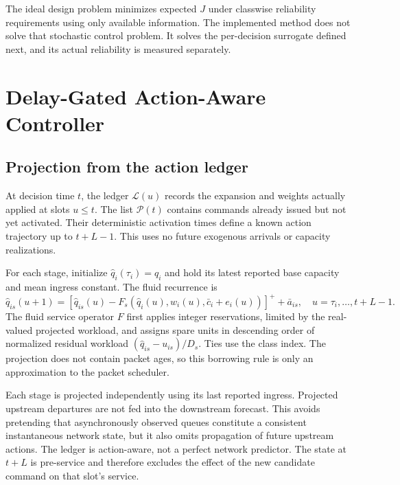 \documentclass[10pt,a4paper]{article}
\newcommand{\pos}[1]{\left[#1\right]^+}
\begin{document}
The ideal design problem minimizes expected $J$ under classwise reliability
requirements using only available information. The implemented method does not
solve that stochastic control problem. It solves the per-decision surrogate
defined next, and its actual reliability is measured separately.

\section{Delay-Gated Action-Aware Controller}
\subsection{Projection from the action ledger}
At decision time $t$, the ledger $\mathcal L(u)$ records the expansion and weights
actually applied at slots $u\le t$. The list $\mathcal P(t)$ contains commands
already issued but not yet activated. Their deterministic activation times
define a known action trajectory up to $t+L-1$. This uses no future exogenous
arrivals or capacity realizations.

For each stage, initialize $\widehat q_i(\tau_i)=q_i$ and hold its latest
reported base capacity and mean ingress constant. The fluid recurrence is
\begin{equation}
 \widehat q_{is}(u+1)=\pos{\widehat q_{is}(u)-F_s(\widehat q_i(u),w_i(u),
 \bar c_i+e_i(u))}+\bar a_{is},
 \quad u=\tau_i,\ldots,t+L-1.\label{eq:project}
\end{equation}
The fluid service operator $F$ first applies integer reservations, limited by
the real-valued projected workload, and assigns spare units in descending order
of normalized residual workload $(\widehat q_{is}-u_{is})/D_s$. Ties use the class
index. The projection does not contain packet ages, so this borrowing rule is
only an approximation to the packet scheduler.

Each stage is projected independently using its last reported ingress.
Projected upstream departures are not fed into the downstream forecast.
This avoids pretending that asynchronously observed queues constitute a
consistent instantaneous network state, but it also omits propagation of
future upstream actions. The ledger is action-aware, not a perfect network
predictor. The state at $t+L$ is pre-service and therefore excludes the effect
of the new candidate command on that slot's service.
\end{document}
